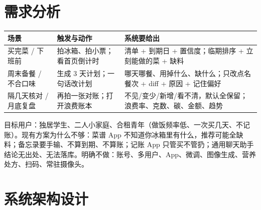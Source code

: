 \section{需求分析}\label{ux9700ux6c42ux4e0eux573aux666f}

{\def\LTcaptype{none} %
\begin{longtable}[]{@{}
  >{\raggedright\arraybackslash}p{}
  >{\raggedright\arraybackslash}p{}
  >{\raggedright\arraybackslash}p{}@{}}
\toprule\noalign{}
\begin{minipage}[b]{\linewidth}\raggedright
场景
\end{minipage} & \begin{minipage}[b]{\linewidth}\raggedright
触发与动作
\end{minipage} & \begin{minipage}[b]{\linewidth}\raggedright
系统要给出
\end{minipage} \\
\midrule\noalign{}
\endhead
\bottomrule\noalign{}
\endlastfoot
买完菜 / 下班前 & 拍冰箱、拍小票；看首页倒计时 & 清单 + 到期日 +
置信度；临期排序 + 立刻能做的菜 + 缺料 \\
周末备餐 / 不合口味 & 生成 3 天计划；一句话改计划 &
哪天哪餐、用掉什么、缺什么；只改点名餐次 + diff + 原因 + 记住偏好 \\
隔几天核对 / 月底复盘 & 再拍一张对账；打开浪费账本 &
不见/变少/新增/看不清，默认全保留；浪费率、克数、碳、金额、趋势 \\
\end{longtable}
}

目标用户：独居学生、二人小家庭、合租青年（做饭频率低、一次买几天、不记账）。现有方案为什么不够：菜谱
App
不知道你冰箱里有什么，推荐可能全缺料；备忘录要手输、不算到期、不算账；记账
App
只管买不管扔；通用聊天助手结论无出处、无法落库。明确不做：账号、多用户、App、微调、图像生成、营养处方、扫码、常驻摄像头。

\section{系统架构设计}\label{ux603bux4f53ux67b6ux6784}

